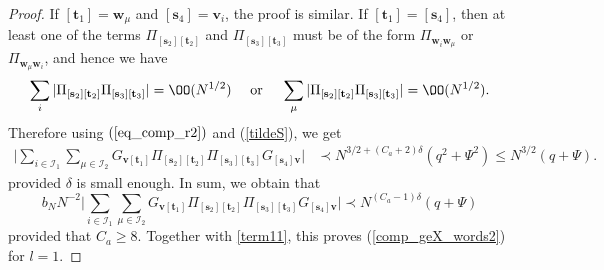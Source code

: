 \begin{proof}
If $[\mathbf t_1]=\mathbf w_\mu$ and $[\mathbf s_4]=\mathbf v_i$, the proof is similar. If $[\mathbf t_1]=[\mathbf s_4]$, then at least one of the terms $\Pi_{[\mathbf s_2][\mathbf t_2]}$ and $\Pi_{[\mathbf s_3][\mathbf t_3]}$ must be of the form $\Pi_{\mathbf w_i\mathbf w_\mu}$ or $\Pi_{\mathbf w_\mu\mathbf w_i}$, and hence we have
$$\sum_i|\Pi_{[\mathbf s_2][\mathbf t_2]}\Pi_{[\mathbf s_3][\mathbf t_3]}|=\OO(N^{1/2}) \quad\text{ or }\quad \sum_\mu | \Pi_{[\mathbf s_2][\mathbf t_2]} \Pi_{[\mathbf s_3][\mathbf t_3]}|=\OO(N^{1/2}).$$
Therefore using $(\ref{eq_comp_r2})$ and (\ref{tildeS}), we get
\begin{align*}
\Big|\sum_{i\in\mathcal I_1}\sum_{\mu\in\mathcal I_2}G_{\mathbf v[\mathbf t_1]} \Pi_{[\mathbf s_2][\mathbf t_2]}\Pi_{[\mathbf s_3][\mathbf t_3]}G_{[\mathbf s_4]\mathbf v}\Big|
& \prec N^{3/2+(C_a+2)\delta}\left(q^2 + \Psi^2 \right) \le  N^{3/2}(q+\Psi) .
\end{align*}
provided $\delta$ is small enough. 
In sum, we obtain that
$$b_NN^{-2}\Big|\sum_{i\in\mathcal I_1}\sum_{\mu\in\mathcal I_2} G_{\mathbf v[\mathbf t_1]} \Pi_{[\mathbf s_2][\mathbf t_2]}\Pi_{[\mathbf s_3][\mathbf t_3]} G_{[\mathbf s_4]\mathbf v}\Big|\prec N^{(C_a-1)\delta}(q+\Psi)$$
provided that $C_a\ge 8$. Together with \eqref{term11}, this proves  (\ref{comp_geX_words2}) for $l=1$.


\end{proof}
